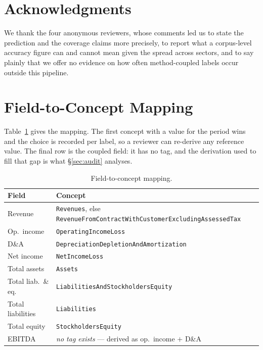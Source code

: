 \documentclass[11pt]{article}
\newcommand{\code}[1]{\texttt{\small #1}}
\begin{document}
\section*{Acknowledgments}

We thank the four anonymous reviewers, whose comments led us to state the prediction and
the coverage claims more precisely, to report what a corpus-level accuracy figure can and
cannot mean given the spread across sectors, and to say plainly that we offer no evidence
on how often method-coupled labels occur outside this pipeline.

\clearpage


\clearpage
\appendix

\section{Field-to-Concept Mapping}
\label{app:concepts}

Table~\ref{tab:concepts} gives the mapping. The first concept with a value for the
period wins and the choice is recorded per label, so a reviewer can re-derive any
reference value. The final row is the coupled field: it has no tag, and the derivation
used to fill that gap is what \S\ref{sec:audit} analyses.

\begin{table}[h]
\centering\small
\begin{tabular}{@{}p{1.9cm}p{4.7cm}@{}}
\toprule
\textbf{Field} & \textbf{Concept} \\
\midrule
Revenue & \code{Revenues}, else \code{Revenue\-From\-Contract\-With\-Customer\-Excluding\-Assessed\-Tax} \\
Op.\ income & \code{Operating\-Income\-Loss} \\
D\&A & \code{Depreciation\-Depletion\-And\-Amortization} \\
Net income & \code{Net\-Income\-Loss} \\
Total assets & \code{Assets} \\
Total liab.\ \& eq. & \code{Liabilities\-And\-Stockholders\-Equity} \\
Total liabilities & \code{Liabilities} \\
Total equity & \code{Stockholders\-Equity} \\
\midrule
EBITDA & \emph{no tag exists} --- derived as
         op.\ income ${+}$ D\&A \\
\bottomrule
\end{tabular}
\caption{Field-to-concept mapping.}
\label{tab:concepts}
\end{table}
\end{document}
